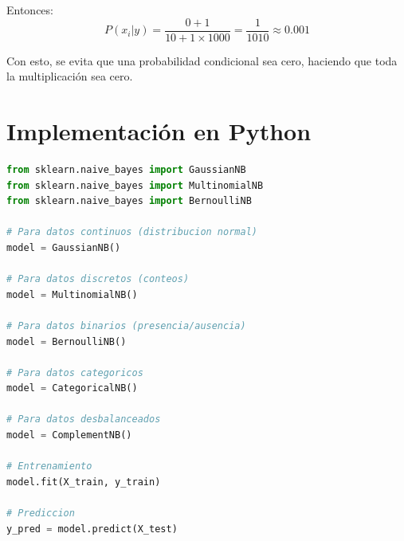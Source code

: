 \documentclass[12pt]{article}
\begin{document}
Entonces:
\[
P(x_i|y) = \frac{0 + 1}{10 + 1 \times 1000} = \frac{1}{1010} \approx 0.001
\]

\vspace{0.5em}

Con esto, se evita que una probabilidad condicional sea cero, haciendo que toda la multiplicación sea cero.

\section{Implementación en Python}

\begin{lstlisting}[language=Python]
from sklearn.naive_bayes import GaussianNB
from sklearn.naive_bayes import MultinomialNB
from sklearn.naive_bayes import BernoulliNB

# Para datos continuos (distribucion normal)
model = GaussianNB()

# Para datos discretos (conteos)
model = MultinomialNB()

# Para datos binarios (presencia/ausencia)
model = BernoulliNB()

# Para datos categoricos
model = CategoricalNB()

# Para datos desbalanceados
model = ComplementNB()

# Entrenamiento
model.fit(X_train, y_train)

# Prediccion
y_pred = model.predict(X_test)
\end{lstlisting}
\end{document}
